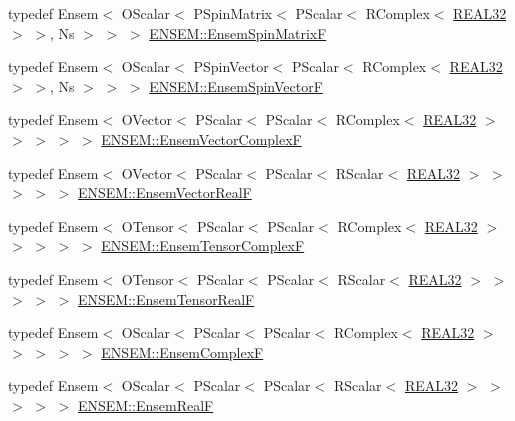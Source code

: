 \begin{DoxyCompactItemize}
\item 
typedef Ensem$<$ O\+Scalar$<$ P\+Spin\+Matrix$<$ P\+Scalar$<$ R\+Complex$<$ \mbox{\hyperlink{adat-devel_2lib_2ensem_2ensem__precision_8h_aba070372e01b28d5afdf9257e8e4390c}{R\+E\+A\+L32}} $>$ $>$, Ns $>$ $>$ $>$ \mbox{\hyperlink{group__defs_gaa172105da4407f0e7ee578ef2860789d}{E\+N\+S\+E\+M\+::\+Ensem\+Spin\+MatrixF}}
\item 
typedef Ensem$<$ O\+Scalar$<$ P\+Spin\+Vector$<$ P\+Scalar$<$ R\+Complex$<$ \mbox{\hyperlink{adat-devel_2lib_2ensem_2ensem__precision_8h_aba070372e01b28d5afdf9257e8e4390c}{R\+E\+A\+L32}} $>$ $>$, Ns $>$ $>$ $>$ \mbox{\hyperlink{group__defs_ga6e77c99e4a59f258b6920dcdc7e8b011}{E\+N\+S\+E\+M\+::\+Ensem\+Spin\+VectorF}}
\item 
typedef Ensem$<$ O\+Vector$<$ P\+Scalar$<$ P\+Scalar$<$ R\+Complex$<$ \mbox{\hyperlink{adat-devel_2lib_2ensem_2ensem__precision_8h_aba070372e01b28d5afdf9257e8e4390c}{R\+E\+A\+L32}} $>$ $>$ $>$ $>$ $>$ \mbox{\hyperlink{group__defs_ga1e5f825ea470aefb26cfc8ac86b07aff}{E\+N\+S\+E\+M\+::\+Ensem\+Vector\+ComplexF}}
\item 
typedef Ensem$<$ O\+Vector$<$ P\+Scalar$<$ P\+Scalar$<$ R\+Scalar$<$ \mbox{\hyperlink{adat-devel_2lib_2ensem_2ensem__precision_8h_aba070372e01b28d5afdf9257e8e4390c}{R\+E\+A\+L32}} $>$ $>$ $>$ $>$ $>$ \mbox{\hyperlink{group__defs_ga3a76e6a8a956cba16fc997a3e86fd24b}{E\+N\+S\+E\+M\+::\+Ensem\+Vector\+RealF}}
\item 
typedef Ensem$<$ O\+Tensor$<$ P\+Scalar$<$ P\+Scalar$<$ R\+Complex$<$ \mbox{\hyperlink{adat-devel_2lib_2ensem_2ensem__precision_8h_aba070372e01b28d5afdf9257e8e4390c}{R\+E\+A\+L32}} $>$ $>$ $>$ $>$ $>$ \mbox{\hyperlink{group__defs_ga0db22e9868127d6f3c8d522dd70aea59}{E\+N\+S\+E\+M\+::\+Ensem\+Tensor\+ComplexF}}
\item 
typedef Ensem$<$ O\+Tensor$<$ P\+Scalar$<$ P\+Scalar$<$ R\+Scalar$<$ \mbox{\hyperlink{adat-devel_2lib_2ensem_2ensem__precision_8h_aba070372e01b28d5afdf9257e8e4390c}{R\+E\+A\+L32}} $>$ $>$ $>$ $>$ $>$ \mbox{\hyperlink{group__defs_ga0da81ce50f4b2ae81c1190e8e266480c}{E\+N\+S\+E\+M\+::\+Ensem\+Tensor\+RealF}}
\item 
typedef Ensem$<$ O\+Scalar$<$ P\+Scalar$<$ P\+Scalar$<$ R\+Complex$<$ \mbox{\hyperlink{adat-devel_2lib_2ensem_2ensem__precision_8h_aba070372e01b28d5afdf9257e8e4390c}{R\+E\+A\+L32}} $>$ $>$ $>$ $>$ $>$ \mbox{\hyperlink{group__defs_gaac62e751aea40f9e3423a058ca20c7c9}{E\+N\+S\+E\+M\+::\+Ensem\+ComplexF}}
\item 
typedef Ensem$<$ O\+Scalar$<$ P\+Scalar$<$ P\+Scalar$<$ R\+Scalar$<$ \mbox{\hyperlink{adat-devel_2lib_2ensem_2ensem__precision_8h_aba070372e01b28d5afdf9257e8e4390c}{R\+E\+A\+L32}} $>$ $>$ $>$ $>$ $>$ \mbox{\hyperlink{group__defs_gab272a08b4cb02e4fae683911645bd3e1}{E\+N\+S\+E\+M\+::\+Ensem\+RealF}}

\end{DoxyCompactItemize}
